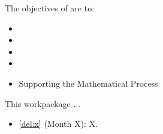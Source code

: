 \addtocounter{wpno}{1}
\begin{Workpackage}{\thewpno}
\WPTitle{\wpname{\thewpno}}


\begin{WPObjectives}
The objectives of \theWP{} are to:
\begin{itemize}
\item
\item
\item
\item
\item Supporting the Mathematical Process
\end{itemize}
\end{WPObjectives}

\begin{WPDescription}
This workpackage  ...
\end{WPDescription}

\begin{WPDeliverables}
\begin{itemize}
\item
\ref{del:x}
(Month X): 
X.
\end{itemize}
\end{WPDeliverables}
\end{Workpackage}
